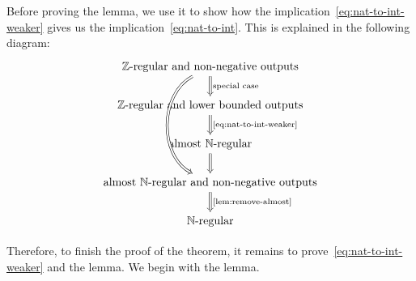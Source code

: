     Before proving the lemma, we use it to show how the implication~\eqref{eq:nat-to-int-weaker} gives us the implication~\eqref{eq:nat-to-int}. This is explained in the following diagram:
    \[
    \begin{tikzcd}
    \text{$\Int$-regular and  non-negative outputs}
    \ar[d,Rightarrow, "\text{special case}"]
    \ar[ddd,Rightarrow,  bend right=62]
    \\
 \text{$\Int$-regular and lower bounded outputs} 
\ar[d,Rightarrow, "\text{\eqref{eq:nat-to-int-weaker}}"] \\
 \text{almost $\Nat$-regular}
\ar[d,Rightarrow]
\\
\text{almost $\Nat$-regular and non-negative outputs}
\ar[d,Rightarrow, "\text{\cref{lem:remove-almost}}"] 
\\
 \text{$\Nat$-regular}
    \end{tikzcd}
    \]

    Therefore, to finish the proof of the theorem, it remains to prove~\eqref{eq:nat-to-int-weaker} and the lemma. We begin with the lemma.

